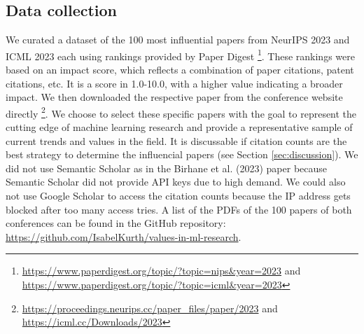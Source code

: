 \documentclass{article}
\begin{document}
\subsection{Data collection}
We curated a dataset of the 100 most influential papers from NeurIPS 2023 and ICML 2023 each using rankings provided by Paper Digest 
\footnote{\url{https://www.paperdigest.org/topic/?topic=nips&year=2023} and \url{https://www.paperdigest.org/topic/?topic=icml&year=2023}}. 
These rankings were based on an impact score, which reflects a combination of paper citations, patent citations, etc. It is a score in 1.0-10.0, 
with a higher value indicating a broader impact. We then downloaded the respective paper from the conference website directly 
\footnote{\url{https://proceedings.neurips.cc/paper_files/paper/2023} and \url{https://icml.cc/Downloads/2023}}. 
We choose to select these specific papers with the goal to represent the cutting edge of machine 
learning research and provide a representative sample of current trends and values in the field. It is discussable if citation counts are the best strategy to determine the influencial papers (see Section \ref{sec:discussion}). 
We did not use Semantic Scholar as in the Birhane et 
al. (2023) paper because Semantic Scholar did not provide API keys due to high demand. We could also not use Google Scholar to access the citation 
counts because the IP address gets blocked after too many access tries. A list of the PDFs of the 100 papers of both conferences can be found in the 
GitHub repository: \url{https://github.com/IsabelKurth/values-in-ml-research}.
\end{document}
